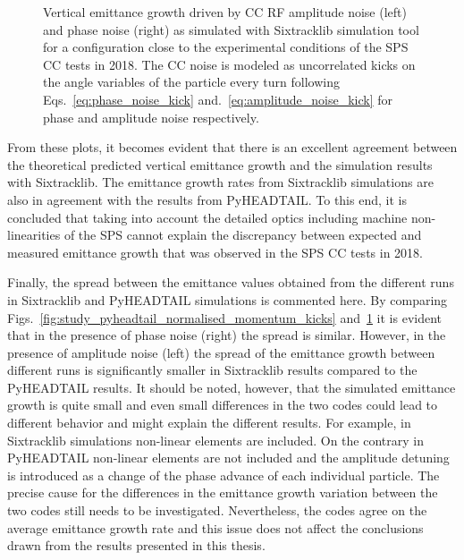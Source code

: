 \begin{figure}[htp]
\begin{subfigure}{.45\textwidth}
    \end{subfigure}
    \caption{Vertical emittance growth driven by CC RF amplitude noise (left) and phase noise (right) as simulated with Sixtracklib simulation tool for a configuration close to the experimental conditions of the SPS CC tests in 2018. The CC noise is modeled as uncorrelated kicks on the angle variables of the particle every turn following Eqs.~\eqref{eq:phase_noise_kick} and.~\eqref{eq:amplitude_noise_kick} for phase and amplitude noise respectively.}
    \label{fig:study_1_sixtracklib_normalised_momentum_kicks}
\end{figure}

From these plots, it becomes evident that there is an excellent agreement between the theoretical predicted vertical emittance growth and the simulation results with Sixtracklib. The emittance growth rates from Sixtracklib simulations are also in agreement with the results from PyHEADTAIL. To this end, it is concluded that taking into account the detailed optics including machine non-linearities of the SPS cannot explain the discrepancy between expected and measured emittance growth that was observed in the SPS CC tests in 2018.

Finally, the spread between the emittance values obtained from the different runs in Sixtracklib and PyHEADTAIL simulations is commented here. By comparing Figs.~\ref{fig:study_pyheadtail_normalised_momentum_kicks} and~\ref{fig:study_1_sixtracklib_normalised_momentum_kicks} it is evident that in the presence of phase noise (right) the spread is similar. However, in the presence of amplitude noise (left) the spread of the emittance growth between different runs is significantly smaller in Sixtracklib results compared to the PyHEADTAIL results. It should be noted, however, that the simulated emittance growth is quite small and even small differences in the two codes could lead to different behavior and might explain the different results. For example, in Sixtracklib simulations non-linear elements are included. On the contrary in PyHEADTAIL non-linear elements are not included and the amplitude detuning is introduced as a change of the phase advance of each individual particle. The precise cause for the differences in the emittance growth variation between the two codes still needs to be investigated. Nevertheless, the codes agree on the average emittance growth rate and this issue does not affect the conclusions drawn from the results presented in this thesis. 
 


